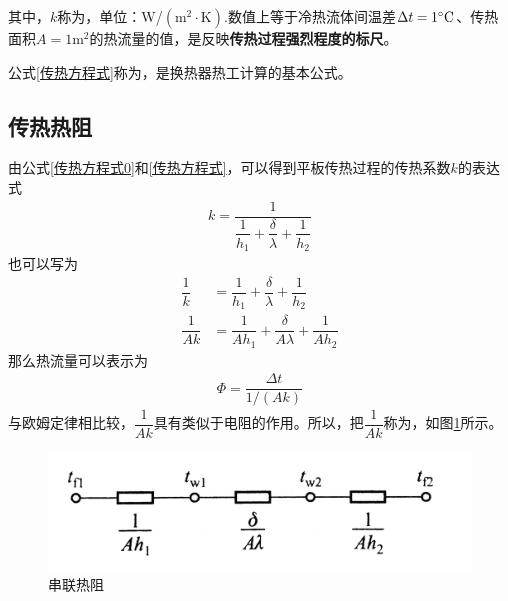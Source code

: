 其中，$k$称为，单位：W/$(\text{m}^2 \cdot \text{K})$.数值上等于冷热流体间温差$\Delta t = 1 {}^{\circ}\text{C}$、传热面积$A = 1 \text{m}^2$的热流量的值，是反映\textbf{传热过程强烈程度的标尺}。

公式\eqref{传热方程式}称为，是换热器热工计算的基本公式。
\vspace*{1em}

\subsection{传热热阻}
由公式\eqref{传热方程式0}和\eqref{传热方程式}，可以得到平板传热过程的传热系数$k$的表达式
\begin{align}
	k = \dfrac{1}{\dfrac{1}{h_1} + \dfrac{\delta }{\lambda} + \dfrac{1}{h_2}}
\end{align}
也可以写为
\begin{align}
	\dfrac{1}{k} &= \dfrac{1}{h_1} + \dfrac{\delta }{\lambda} + \dfrac{1}{h_2}\\[0.5em]
	\dfrac{1}{Ak} &= \dfrac{1}{Ah_1} + \dfrac{\delta }{A \lambda} + \dfrac{1}{A h_2}
\end{align}
那么热流量可以表示为
\begin{align}
	\varPhi = \dfrac{\Delta t}{1/(Ak)}
\end{align}
与欧姆定律相比较，$\dfrac{1}{Ak}$具有类似于电阻的作用。所以，把$\dfrac{1}{Ak}$称为，如图\ref{串联热阻}所示。

\begin{figure}[!htb]
	\centering
	\includegraphics[width=0.5\linewidth]{pic/热阻.jpeg}
	\vspace*{-1.5em}
	\caption{串联热阻}
	\label{串联热阻}
\end{figure}






















